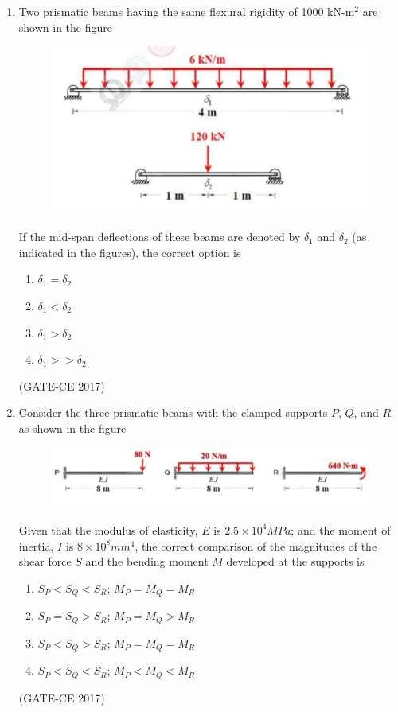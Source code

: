 \documentclass[journal,12pt,onecolumn]{article}
\theoremstyle{remark}
\begin{document}
\begin{enumerate}
    \item Two prismatic beams having the same flexural rigidity of 1000 kN-m$^2$ are shown in the figure 
    \begin{figure}[H]
    \centering
    \includegraphics[width=0.7\columnwidth]{figs/q31.jpg}  
    \caption{}
    \label{fig:7}
    \end{figure}
    If the mid-span deflections of these beams are denoted by $\delta_1$ and $\delta_2$ (as indicated in the figures), the correct option is
    \begin{multicols}{4}
    \begin{enumerate}
        \item $\delta_1 = \delta_2$  
        \item $\delta_1 < \delta_2$  
        \item $\delta_1 > \delta_2$  
        \item $\delta_1 >> \delta_2$  
    \end{enumerate}
    \end{multicols}
    \hfill (GATE-CE 2017)

    \item Consider the three prismatic beams with the clamped supports $ P $, $ Q $, and $ R $ as shown in the figure 
    \begin{figure}[H]
    \centering
    \includegraphics[width=0.7\columnwidth]{figs/q32.jpg}  
    \caption{}
    \label{fig:8}
    \end{figure}
    Given that the modulus of elasticity, $ E $ is $ 2.5 \times 10^4 MPa $; and the moment of inertia, $ I $ is $ 8 \times 10^8 mm^4 $, the correct comparison of the magnitudes of the shear force $ S $ and the bending moment $ M $ developed at the supports is
    \begin{enumerate}
        \item $ S_P < S_Q < S_R $;  $ M_P = M_Q = M_R $  
        \item $ S_P = S_Q > S_R $;  $ M_P = M_Q > M_R $  
        \item $ S_P < S_Q > S_R $;  $ M_P = M_Q = M_R $  
        \item $ S_P < S_Q < S_R $;  $ M_P < M_Q < M_R $  
    \end{enumerate}
    \hfill (GATE-CE 2017)


\end{enumerate}
\end{document}
